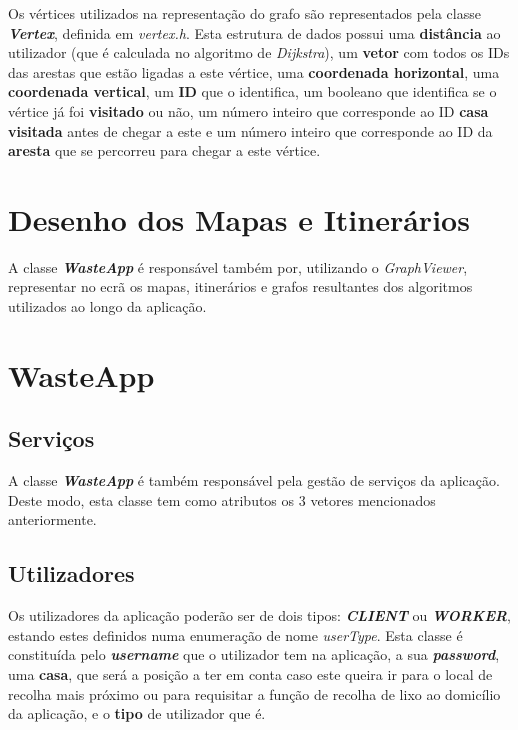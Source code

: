 \documentclass[article, a4paper, 12pt, oneside]{memoir}
\begin{document}
Os vértices utilizados na representação do grafo são representados pela classe \textbf{\textit{Vertex}}, definida em \textit{vertex.h}. Esta estrutura de dados possui uma \textbf{distância} ao utilizador (que é calculada no algoritmo de \textit{Dijkstra}), um \textbf{vetor} com todos os IDs das arestas que estão ligadas a este vértice, uma \textbf{coordenada horizontal}, uma \textbf{coordenada vertical}, um \textbf{ID} que o identifica, um booleano que identifica se o vértice já foi \textbf{visitado} ou não, um número inteiro que corresponde ao ID \textbf{casa visitada} antes de chegar a este e um número inteiro que corresponde ao ID da \textbf{aresta} que se percorreu para chegar a este vértice.

\section{Desenho dos Mapas e Itinerários}

A classe \textbf{\textit{WasteApp}} é responsável também por, utilizando o \textit{GraphViewer}, representar no ecrã os mapas, itinerários e grafos resultantes dos algoritmos utilizados ao longo da aplicação.

\section{WasteApp}

\subsection{Serviços}

A classe \textbf{\textit{WasteApp}} é também responsável pela gestão de serviços da aplicação. Deste modo, esta classe tem como atributos os 3 vetores mencionados anteriormente.

\subsection{Utilizadores}

Os utilizadores da aplicação poderão ser de dois tipos: \textit{\textbf{CLIENT}} ou \textbf{\textit{WORKER}}, estando estes definidos numa enumeração de nome \textit{userType}. Esta classe é constituída pelo \textit{\textbf{username}} que o utilizador tem na aplicação, a sua \textit{\textbf{password}}, uma \textbf{casa}, que será a posição a ter em conta caso este queira ir para o local de recolha mais próximo ou para requisitar a função de recolha de lixo ao domicílio da aplicação, e o \textbf{tipo} de utilizador que é.
\end{document}
